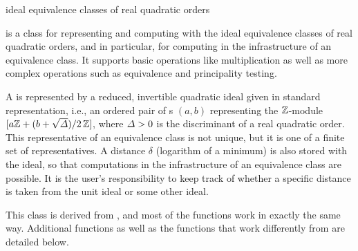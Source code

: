 
\newcommand{\dist}{\mathit{dist}}
\newcommand{\isequiv}{\mathit{is\uscore equiv}}
\newcommand{\isprin}{\mathit{is\uscore prin}}



\NAME

 \dotfill ideal equivalence classes of real quadratic orders



\ABSTRACT

 is a class for representing and computing with the ideal equivalence
classes of real quadratic orders, and in particular, for computing in the infrastructure of an
equivalence class.  It supports basic operations like multiplication as well as more complex
operations such as equivalence and principality testing.



\DESCRIPTION

A  is represented by a reduced, invertible quadratic ideal given in standard
representation, i.e., an ordered pair of s $(a,b)$ representing the $\mathbb{Z}$-module
$[a\mathbb{Z} + (b + \sqrt{\varDelta}) / 2 \,\mathbb{Z} ]$, where $\varDelta > 0$ is the discriminant of a real
quadratic order.  This representative of an equivalence class is not unique, but it is one of a
finite set of representatives.  A distance $\delta$ (logarithm of a minimum) is also stored with
the ideal, so that computations in the infrastructure of an equivalence class are possible.  It
is the user's responsibility to keep track of whether a specific distance is taken from the unit
ideal or some other ideal.

This class is derived from , and most of the functions work in exactly the same
way.  Additional functions as well as the functions that work differently from 
are detailed below.



